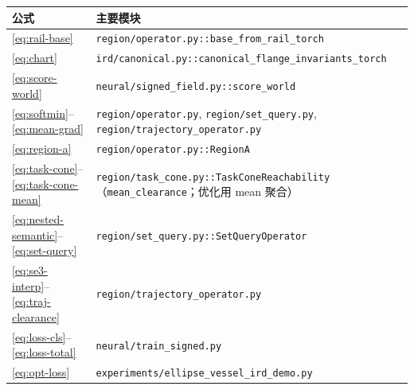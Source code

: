 \documentclass[UTF8,a4paper,11pt,fontset=fandol]{ctexart}
\begin{document}
\begin{center}
\begin{tabular}{@{}ll@{}}
\toprule
公式 & 主要模块 \\
\midrule
\eqref{eq:rail-base}
  & \texttt{region/operator.py::base\_from\_rail\_torch} \\
\eqref{eq:chart}
  & \texttt{ird/canonical.py::canonical\_flange\_invariants\_torch} \\
\eqref{eq:score-world}
  & \texttt{neural/signed\_field.py::score\_world} \\
\eqref{eq:softmin}--\eqref{eq:mean-grad}
  & \texttt{region/operator.py}, \texttt{region/set\_query.py},
    \texttt{region/trajectory\_operator.py} \\
\eqref{eq:region-a}
  & \texttt{region/operator.py::RegionA} \\
\eqref{eq:task-cone}--\eqref{eq:task-cone-mean}
  & \texttt{region/task\_cone.py::TaskConeReachability}
    （\texttt{mean\_clearance}；优化用 mean 聚合） \\
\eqref{eq:nested-semantic}--\eqref{eq:set-query}
  & \texttt{region/set\_query.py::SetQueryOperator} \\
\eqref{eq:se3-interp}--\eqref{eq:traj-clearance}
  & \texttt{region/trajectory\_operator.py} \\
\eqref{eq:loss-cls}--\eqref{eq:loss-total}
  & \texttt{neural/train\_signed.py} \\
\eqref{eq:opt-loss}
  & \texttt{experiments/ellipse\_vessel\_ird\_demo.py} \\
\bottomrule
\end{tabular}
\end{center}
\end{document}
